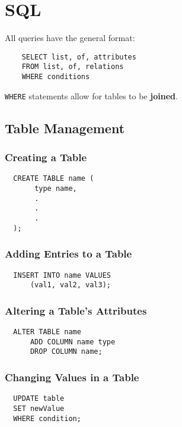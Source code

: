 \documentclass{article}
\begin{document}
\section{SQL}

All queries have the general format:

\begin{lstlisting}
    SELECT list, of, attributes
    FROM list, of, relations
    WHERE conditions
\end{lstlisting}

\texttt{WHERE} statements allow for tables to be \textbf{joined}.

\subsection{Table Management}

\subsubsection{Creating a Table}

\begin{lstlisting}
  CREATE TABLE name (
       type name,
       .
       .
       .
  );
\end{lstlisting}

\subsubsection{Adding Entries to a Table}

\begin{lstlisting}
  INSERT INTO name VALUES
      (val1, val2, val3);
\end{lstlisting}

\subsubsection{Altering a Table's Attributes}

\begin{lstlisting}
  ALTER TABLE name
      ADD COLUMN name type
      DROP COLUMN name;
\end{lstlisting}

\subsubsection{Changing Values in a Table}

\begin{lstlisting}
  UPDATE table
  SET newValue
  WHERE condition;
\end{lstlisting}
\end{document}
